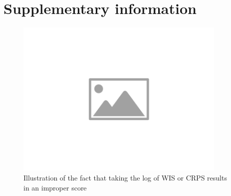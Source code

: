 \documentclass{article}
\begin{document}
 




\newpage

\appendix
\section{Supplementary information}

\begin{figure}[h!]
    \centering
    \includegraphics[width=0.9\textwidth]{output/placeholder-image.png}
    \caption{Illustration of the fact that taking the log of WIS or CRPS results in an improper score}
    \label{fig:log-improper}
\end{figure}
\end{document}
